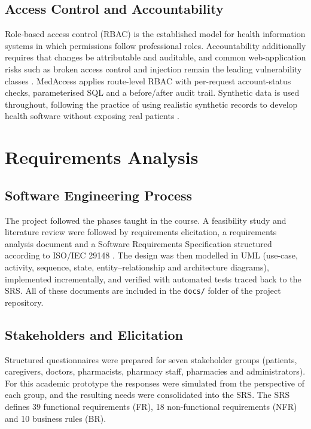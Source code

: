 \documentclass[11pt,a4paper]{article}
\begin{document}
\subsection{Access Control and Accountability}
Role-based access control (RBAC) \cite{sandhu1996,ferraiolo2001} is the established model for health information systems in which permissions follow professional roles. Accountability additionally requires that changes be attributable and auditable, and common web-application risks such as broken access control and injection remain the leading vulnerability classes \cite{owasp2021}. MedAccess applies route-level RBAC with per-request account-status checks, parameterised SQL and a before/after audit trail. Synthetic data is used throughout, following the practice of using realistic synthetic records to develop health software without exposing real patients \cite{synthea}.

\section{Requirements Analysis}\label{ch:req}

\subsection{Software Engineering Process}
The project followed the phases taught in the course. A feasibility study and literature review were followed by requirements elicitation, a requirements analysis document and a Software Requirements Specification structured according to ISO/IEC 29148 \cite{iso29148}. The design was then modelled in UML (use-case, activity, sequence, state, entity--relationship and architecture diagrams), implemented incrementally, and verified with automated tests traced back to the SRS. All of these documents are included in the \texttt{docs/} folder of the project repository.

\subsection{Stakeholders and Elicitation}
Structured questionnaires were prepared for seven stakeholder groups (patients, caregivers, doctors, pharmacists, pharmacy staff, pharmacies and administrators). For this academic prototype the responses were simulated from the perspective of each group, and the resulting needs were consolidated into the SRS. The SRS defines 39 functional requirements (FR), 18 non-functional requirements (NFR) and 10 business rules (BR).
\end{document}
